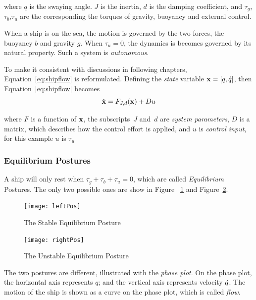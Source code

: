 where $q$ is the swaying angle.
$J$ is the inertia,  
$d$ is the damping coefficient,
and $\tau_{g}$,$\tau_{b}$,$\tau_{u}$ are the corresponding the torques of gravity, buoyancy and external control.

When a ship is on the sea, the motion is governed by the two forces, the buoyancy $b$ and gravity $g$.
When $\tau_{u}=0$,  the dynamics is becomes governed by its natural property.
Such a system is \emph{autonomous}.

To make it consistent with discussions in following chapters, Equation~\ref{eq:shipflow} is reformulated.
Defining the \emph{state} variable $\mathbf{x}=[q,\dot{q}]$, then Equation~\ref{eq:shipflow} becomes
\[
\dot{\mathbf{x}}=F_{J,d}(\mathbf{x})+Du
\]

where 
$F$ is a function of $\mathbf{x}$, the subscripts~$J$ and~$d$ are \emph{system parameters},
$D$ is a matrix, which describes how the control effort is applied,
and $u$ is \emph{control input}, for this example $u$ is $\tau_{u}$



\subsubsection*{Equilibrium Postures}
A ship will only rest when $\tau_{g}+\tau_{b}+\tau_{u}=0$, which are called \emph{Equilibrium} Postures.
The only two possible ones are show in Figure ~\ref{fig:ShipEqulibriumStable} and Figure~\ref{fig:ShipEqulibriumUnstable}.
\begin{figure}[!htbp]
  \begin{center}
     \texttt{[image: leftPos]}
    \caption{The Stable Equilibrium Posture}
    \label{fig:ShipEqulibriumStable}
  \end{center}
\end{figure}

\begin{figure}[!htbp]
  \begin{center}
     \texttt{[image: rightPos]}
    \caption{The Unstable Equilibrium Posture}
    \label{fig:ShipEqulibriumUnstable}
  \end{center}
\end{figure}



The two postures are different, illustrated with the \emph{phase plot}.
On the phase plot, the horizontal axis represents  $q$; and the vertical axis represents velocity $\dot{q}$. 
The motion of the ship is shown as a curve on the phase plot, which is called \emph{flow}.

